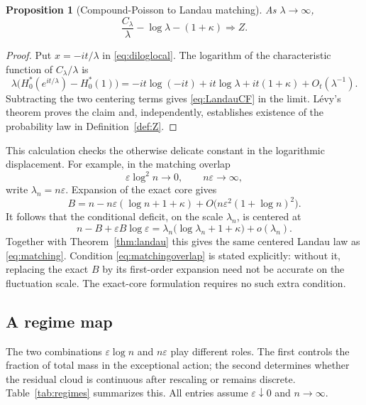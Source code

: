 \documentclass[11pt,a4paper]{article}
\newtheorem{proposition}[theorem]{Proposition}
\theoremstyle{definition}\newtheorem{definition}[theorem]{Definition}
\theoremstyle{remark}\newtheorem{remark}[theorem]{Remark}
\newcommand{\eps}{\varepsilon}
\newcommand{\1}{\mathbf 1}
\begin{document}
\begin{proposition}[Compound-Poisson to Landau matching]
\label{prop:matching}
As $\lambda\to\infty$,
\begin{equation}\label{eq:matching}
 \frac{C_\lambda}{\lambda}-\log\lambda-(1+\kappa)
 \Longrightarrow Z.
\end{equation}
\end{proposition}
\begin{proof}
Put $x=-it/\lambda$ in \eqref{eq:diloglocal}. The logarithm of the
characteristic function of $C_\lambda/\lambda$ is
\[
 \lambda\bigl(H_0^*(e^{it/\lambda})-H_0^*(1)\bigr)
 =-it\log(-it)+it\log\lambda+it(1+\kappa)+O_t(\lambda^{-1}).
\]
Subtracting the two centering terms gives \eqref{eq:LandauCF} in the
limit. L\'evy's theorem proves the claim and, independently, establishes
existence of the probability law in Definition~\ref{def:Z}.
\end{proof}

This calculation checks the otherwise delicate constant in the
logarithmic displacement. For example, in the matching overlap
\begin{equation}\label{eq:matchingoverlap}
 \eps\log^2 n\longrightarrow0,\qquad n\eps\longrightarrow\infty,
\end{equation}
write $\lambda_n=n\eps$. Expansion of the exact core gives
\begin{equation}\label{eq:Bexpand}
 B=n-n\eps(\log n+1+\kappa)
       +O\bigl(n\eps^2(1+\log n)^2\bigr).
\end{equation}
It follows that the conditional deficit, on the scale $\lambda_n$,
is centered at
\begin{equation}\label{eq:centerMatch}
 n-B+\eps B\log\eps
 =\lambda_n\bigl(\log\lambda_n+1+\kappa\bigr)+o(\lambda_n).
\end{equation}
Together with Theorem~\ref{thm:landau} this gives the same centered
Landau law as \eqref{eq:matching}. Condition
\eqref{eq:matchingoverlap} is stated explicitly: without it, replacing
the exact $B$ by its first-order expansion need not be accurate on the
fluctuation scale. The exact-core formulation requires no such extra
condition.

\subsection{A regime map}

The two combinations $\eps\log n$ and $n\eps$ play different roles.
The first controls the fraction of total mass in the exceptional action;
the second determines whether the residual cloud is continuous after
rescaling or remains discrete. Table~\ref{tab:regimes} summarizes this.
All entries assume $\eps\downarrow0$ and $n\to\infty$.
\end{document}
